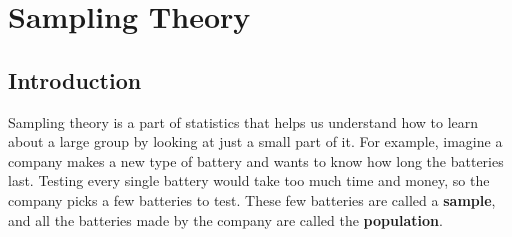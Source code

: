\documentclass[twoside]{book}
\begin{document}

\begin{figure}[!h]
  \centering
\end{figure}



\chapter{Sampling Theory}
\section{Introduction}
Sampling theory is a part of statistics that helps us understand how to learn about a large group by looking at just a small part of it. For example, imagine a company makes a new type of battery and wants to know how long the batteries last. Testing every single battery would take too much time and money, so the company picks a few batteries to test. These few batteries are called a \textbf{sample}, and all the batteries made by the company are called the \textbf{population}. 
\end{document}
